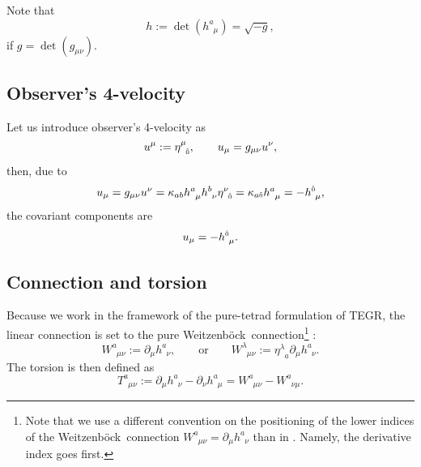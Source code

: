 \documentclass[
10pt, %
a4paper, %
oneside, %
headinclude,footinclude, %
BCOR5mm, %
]{scrartcl}
\newcommand{\pd}[1]{\partial_{#1}}
\newcommand{\mg}[1]{\kappa_{#1}}			%
\newcommand{\tetrsymbol}{h}
\newcommand{\itetrsymbol}{\eta}
\newcommand{\itetr}[2]{\itetrsymbol^{#1}_{\phantom{#1}#2}}
\newcommand{\tetr}[2]{\tetrsymbol^{#1}_{\phantom{#1}#2}}
\newcommand{\detTetr}{\tetrsymbol}
\newcommand{\D}[1]{\partial_{#1}} %
\newcommand{\Tors}[2]{T^{#1}_{\phantom{a}#2}}
\newcommand{\w}[2]{W^{#1}_{\phantom{#1}#2}}
\newcommand{\We}{Weitzenb\"ock}
\newcommand{\KD}[2]{\delta^{#1}_{\ #2}}
\newcommand{\indalg}[1]{\hat{\mathsmaller{#1}}}
\newcommand{\ho}[1]{\textcolor{magenta}{HO: #1}}
\begin{document}

Note that 
\begin{equation}\label{eqn.det}
	\detTetr := \det(\tetr{a}{\mu}) = \sqrt{-g},
\end{equation}
if $ g = \det(g_{\mu\nu}) $.

\subsection{Observer's 4-velocity}

Let us introduce observer's 4-velocity as
\begin{equation}\label{eqn.4v}
	u^\mu := \itetr{\mu}{\indalg{0}}, \qquad u_\mu = g_{\mu\nu}u^\nu,
\end{equation}
then, due to
\begin{equation}
	u_\mu = g_{\mu\nu} u^\nu = \mg{ab}\tetr{a}{\mu}\tetr{b}{\nu}\itetr{\nu}{\indalg{0}} = 
	\mg{a\indalg{0}}\tetr{a}{\mu} = -\tetr{\indalg{0}}{\mu},
\end{equation}\label{eqn.4v.cov}
the covariant components are
\begin{equation}
	u_\mu = -\tetr{\indalg{0}}{\mu}.
\end{equation}
%




\subsection{Connection and torsion}

Because we work in the framework of the pure-tetrad formulation of TEGR, the linear connection 
is set to the pure \We\ connection\footnote{Note that we use a different convention on the 
positioning of the lower indices of the \We\ connection $ \w{a}{\mu\nu} = \pd{\mu}\tetr{a}{\nu} $ 
than in \cite{AldrovandiPereiraBook}. Namely, the derivative index goes first.} 
\cite{AldrovandiPereiraBook,KleinertMultivalued}: 
\begin{equation}\label{eqn.We}
	\w{a}{\mu\nu} := \pd{\mu}\tetr{a}{\nu}, 
	\qquad
	\text{or}
	\qquad
	\w{\lambda}{\mu\nu} := \itetr{\lambda}{a}\pd{\mu}\tetr{a}{\nu}.
\end{equation}
The torsion is then defined as
\begin{equation}\label{eqn.def.tors}
\Tors{a}{\mu\nu}:=\D{\mu}\tetr{a}{\nu} - \D{\nu}\tetr{a}{\mu} = 
\w{a}{\mu\nu} - \w{a}{\nu\mu}.
\end{equation}
\end{document}
